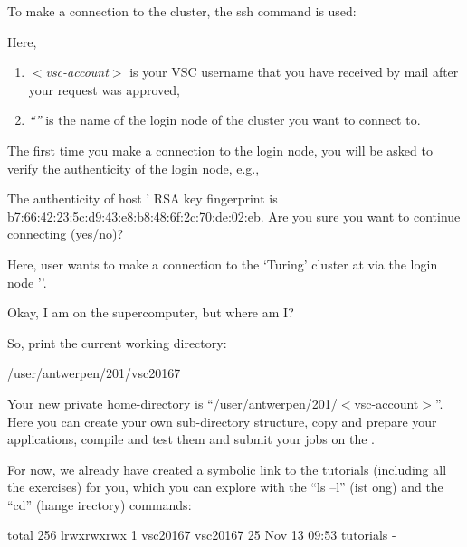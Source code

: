 To make a connection to the \hpc cluster, the ssh command is used:

\begin{prompt}
\end{prompt}

Here,

\begin{enumerate}
  \item  \emph{$<$vsc-account$>$} is your VSC username that you have received
    by mail after your request was approved,
  \item  \emph{``\loginnode''} is the name of the login
    node of the \hpc cluster you want to connect to.
\end{enumerate}

The first time you make a connection to the login node, you will be asked to
verify the authenticity of the login node, e.g.,

\begin{prompt}
The authenticity of host '%
RSA key fingerprint is b7:66:42:23:5c:d9:43:e8:b8:48:6f:2c:70:de:02:eb.
Are you sure you want to continue connecting (yes/no)? %
\end{prompt}

Here, user \userid wants to make a connection to the `Turing' cluster at
\university via the login node '\loginnode'.

\ifantwerpen
{}
\fi
Okay, I am on the supercomputer, but where am I?

So, print the current working directory:
\begin{prompt}
/user/antwerpen/201/vsc20167
\end{prompt}

Your new private home-directory is ``/user/antwerpen/201/$<$vsc-account$>$''.
Here you can create your own sub-directory structure, copy and prepare your
applications, compile and test them and submit your jobs on the \hpc.

For now, we already have created a symbolic link to the tutorials (including
all the exercises) for you, which you can explore with the ``ls --l''
(ist ong) and the ``cd'' (hange
irectory) commands:

\begin{prompt}
total 256
lrwxrwxrwx 1 vsc20167 vsc20167 25 Nov 13 09:53 tutorials -%
\end{prompt}

